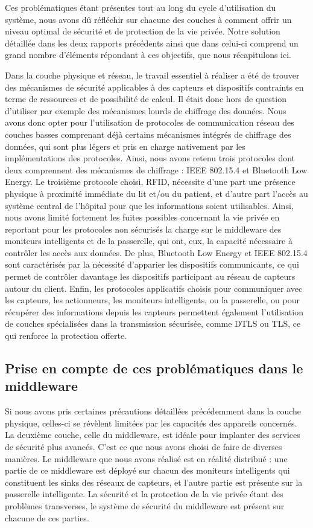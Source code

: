 Ces problématiques étant présentes tout au long du cycle d’utilisation du système, nous avons dû réfléchir sur chacune des couches à comment offrir un niveau optimal de sécurité et de protection de la vie privée. Notre solution détaillée dans les deux rapports précédents ainsi que dans celui-ci comprend un grand nombre d’éléments répondant à ces objectifs, que nous récapitulons ici.

Dans la couche physique et réseau, le travail essentiel à réaliser a été de trouver des mécanismes de sécurité applicables à des capteurs et dispositifs contraints en terme de ressources et de possibilité de calcul. Il était donc hors de question d’utiliser par exemple des mécanismes lourds de chiffrage des données. Nous avons donc opter pour l’utilisation de protocoles de communication réseau des couches basses comprenant déjà certains mécanismes intégrés de chiffrage des données, qui sont plus légers et pris en charge nativement par les implémentations des protocoles. Ainsi, nous avons retenu trois protocoles dont deux comprennent des mécanismes de chiffrage : IEEE 802.15.4 et Bluetooth Low Energy. Le troisième protocole choisi, RFID, nécessite d’une part une présence physique à proximité immédiate du lit et/ou du patient, et d’autre part l’accès au système central de l’hôpital pour que les informations soient utilisables. Ainsi, nous avons limité fortement les fuites possibles concernant la vie privée en reportant pour les protocoles non sécurisés la charge sur le middleware des moniteurs intelligents et de la passerelle, qui ont, eux, la capacité nécessaire à contrôler les accès aux données. De plus, Bluetooth Low Energy et IEEE 802.15.4 sont caractérisés par la nécessité d’apparier les dispositifs communicants, ce qui permet de contrôler davantage les dispositifs participant au réseau de capteurs autour du client. Enfin, les protocoles applicatifs choisis pour communiquer avec les capteurs, les actionneurs, les moniteurs intelligents, ou la passerelle, ou pour récupérer des informations depuis les capteurs permettent également l’utilisation de couches spécialisées dans la transmission sécurisée, comme DTLS ou TLS, ce qui renforce la protection offerte.
 
\subsection{Prise en compte de ces problématiques dans le middleware}

Si nous avons pris certaines précautions détaillées précédemment dans la couche physique, celles-ci se révèlent limitées par les capacités des appareils concernés. La deuxième couche, celle du middleware, est idéale pour implanter des services de sécurité plus avancés. C’est ce que nous avons choisi de faire de diverses manières. Le middleware que nous avons réalisé est en réalité distribué : une partie de ce middleware est déployé sur chacun des moniteurs intelligents qui constituent les sinks des réseaux de capteurs, et l’autre partie est présente sur la passerelle intelligente. La sécurité et la protection de la vie privée étant des problèmes transverses, le système de sécurité du middleware est présent sur chacune de ces parties.


